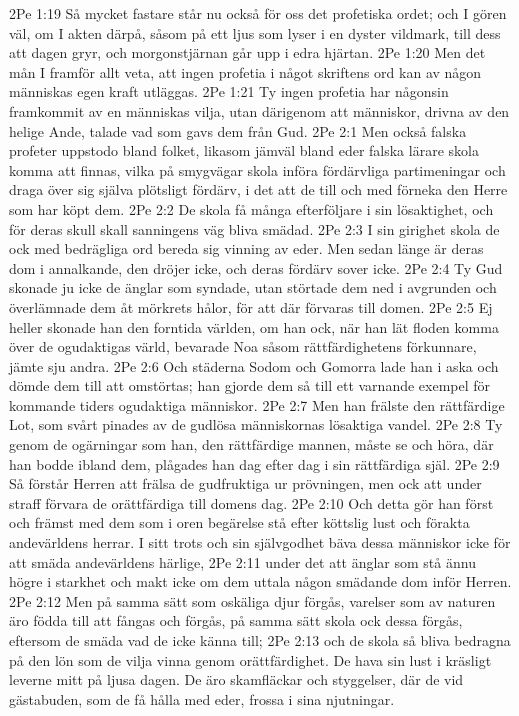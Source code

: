 2Pe 1:19  Så mycket fastare står nu också för oss det profetiska ordet; och I gören väl, om I akten därpå, såsom på ett ljus som lyser i en dyster vildmark, till dess att dagen gryr, och morgonstjärnan går upp i edra hjärtan.
2Pe 1:20  Men det mån I framför allt veta, att ingen profetia i något skriftens ord kan av någon människas egen kraft utläggas.
2Pe 1:21  Ty ingen profetia har någonsin framkommit av en människas vilja, utan därigenom att människor, drivna av den helige Ande, talade vad som gavs dem från Gud.
2Pe 2:1  Men också falska profeter uppstodo bland folket, likasom jämväl bland eder falska lärare skola komma att finnas, vilka på smygvägar skola införa fördärvliga partimeningar och draga över sig själva plötsligt fördärv, i det att de till och med förneka den Herre som har köpt dem.
2Pe 2:2  De skola få många efterföljare i sin lösaktighet, och för deras skull skall sanningens väg bliva smädad.
2Pe 2:3  I sin girighet skola de ock med bedrägliga ord bereda sig vinning av eder. Men sedan länge är deras dom i annalkande, den dröjer icke, och deras fördärv sover icke.
2Pe 2:4  Ty Gud skonade ju icke de änglar som syndade, utan störtade dem ned i avgrunden och överlämnade dem åt mörkrets hålor, för att där förvaras till domen.
2Pe 2:5  Ej heller skonade han den forntida världen, om han ock, när han lät floden komma över de ogudaktigas värld, bevarade Noa såsom rättfärdighetens förkunnare, jämte sju andra.
2Pe 2:6  Och städerna Sodom och Gomorra lade han i aska och dömde dem till att omstörtas; han gjorde dem så till ett varnande exempel för kommande tiders ogudaktiga människor.
2Pe 2:7  Men han frälste den rättfärdige Lot, som svårt pinades av de gudlösa människornas lösaktiga vandel.
2Pe 2:8  Ty genom de ogärningar som han, den rättfärdige mannen, måste se och höra, där han bodde ibland dem, plågades han dag efter dag i sin rättfärdiga själ.
2Pe 2:9  Så förstår Herren att frälsa de gudfruktiga ur prövningen, men ock att under straff förvara de orättfärdiga till domens dag.
2Pe 2:10  Och detta gör han först och främst med dem som i oren begärelse stå efter köttslig lust och förakta andevärldens herrar. I sitt trots och sin självgodhet bäva dessa människor icke för att smäda andevärldens härlige,
2Pe 2:11  under det att änglar som stå ännu högre i starkhet och makt icke om dem uttala någon smädande dom inför Herren.
2Pe 2:12  Men på samma sätt som oskäliga djur förgås, varelser som av naturen äro födda till att fångas och förgås, på samma sätt skola ock dessa förgås, eftersom de smäda vad de icke känna till;
2Pe 2:13  och de skola så bliva bedragna på den lön som de vilja vinna genom orättfärdighet. De hava sin lust i kräsligt leverne mitt på ljusa dagen. De äro skamfläckar och styggelser, där de vid gästabuden, som de få hålla med eder, frossa i sina njutningar.
